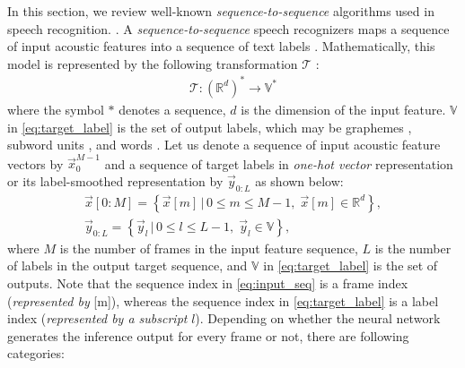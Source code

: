 \documentclass{article}
\begin{document}
In this section, we review well-known {\it sequence-to-sequence} algorithms
used in speech recognition.
\cite{
j_chorowski_nips_2015_00, 
a_graves_corr_2012_00, 
y_he_icassp_2019_00,
r_prabhavalkar_interspeech_2017_00}. 
A {\it sequence-to-sequence}
speech recognizers maps a sequence of input acoustic features into a sequence 
of text labels  \cite{r_prabhavalkar_interspeech_2017_00}. 
Mathematically, this model is 
represented by the following transformation $\mathcal{T}$ 
\cite{a_graves_icml_2006_00}:
\begin{align}
  \mathcal{T} : \left(\mathbb{R}^d\right)^{*} \rightarrow \mathbb{V}^{*}
	\label{eq:transformation}
\end{align}
where the symbol ${*}$ denotes a sequence, $d$ is the dimension of the input 
feature. $\mathbb{V}$ in \eqref{eq:target_label} is the set of output
labels, which may be graphemes 
\cite{j_chorowski_nips_2015_00,
w_chan_icassp_2016_00},
subword units \cite{
a_zeyer_interspeech_2018_00,
c_chiu_icassp_2018_00},
 and words \cite{h_soltau_interspeech_2017_00}.
Let us denote a sequence of input acoustic feature vectors by 
$\vec{x}_{0}^{M-1}$ and a sequence of target labels in 
{\it one-hot vector} representation or its label-smoothed 
representation \cite{} by 
$\vec{y}_{0:L}$ as shown below:
\begin{subequations}
  \begin{align}
    \vec{x}[0:M]  =  
      \left\{\vec{x}[m]
          \, \big| \, 0 \le m \le M - 1, \; \vec{x}[m] \in \mathbb{R}^d \right\},  
    \label{eq:input_seq} \\
    \vec{y}_{0:L}  =  
      \left\{\vec{y}_l \,  \big| \, 0 \le l \le L-1, \; \vec{y}_l \in \mathbb{V} \right\}, 
    \label{eq:target_label}
  \end{align}
\end{subequations}
where $M$ is the number of frames in the input feature sequence,
$L$ is the number of labels in the output target sequence,
 and $\mathbb{V}$ in \eqref{eq:target_label} is the set of outputs.
Note that the sequence index in \eqref{eq:input_seq} is a frame
index ({\it represented by} [m]), 
whereas the sequence index in \eqref{eq:target_label} is 
a label index ({\it represented by a subscript} $l$). 
Depending on whether the neural network generates
the inference output for every frame or not, there are following
categories:
\end{document}
